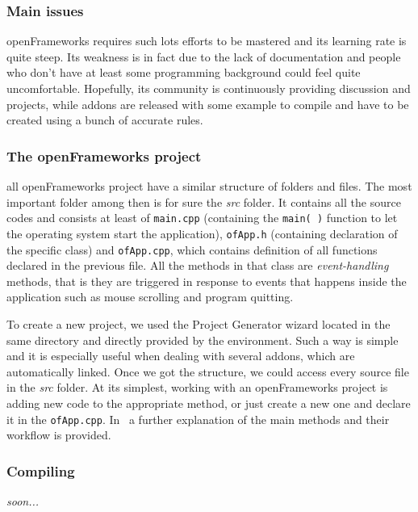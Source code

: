 \documentclass[journal]{IEEEtran}
\begin{document}
\subsubsection{Main issues}
openFrameworks requires such lots efforts to be mastered and its learning rate is quite steep. Its weakness is in fact due to the lack of documentation and people who don't have at least some programming background could feel quite uncomfortable. Hopefully, its community is continuously providing discussion and projects, while addons are released with some example to compile and have to be created using a bunch of accurate rules.

\subsubsection{The openFrameworks project}
all openFrameworks project have a similar structure of folders and files. The most important folder among then is for sure the \emph{src} folder. It contains all the source codes and consists at least of \texttt{main.cpp} (containing the \texttt{main( )} function to let the operating system start the application), \texttt{ofApp.h} (containing declaration of the specific class) and \texttt{ofApp.cpp}, which contains definition of all functions declared in the previous file. All the methods in that class are \emph{event-handling} methods, that is they are triggered in response to events that happens inside the application such as mouse scrolling and program quitting.%

To create a new project, we used the Project Generator wizard located in the same directory and directly provided by the environment. Such a way is simple and it is especially useful when dealing with several addons, which are automatically linked. Once we got the structure, we could access every source file in the \emph{src} folder. At its simplest, working with an openFrameworks project is adding new code to the appropriate method, or just create a new one and declare it in the \texttt{ofApp.cpp}. In~\cite{} a further explanation of the main methods and their workflow is provided.

\subsubsection{Compiling}
\textit{soon...}

 
\end{document}
